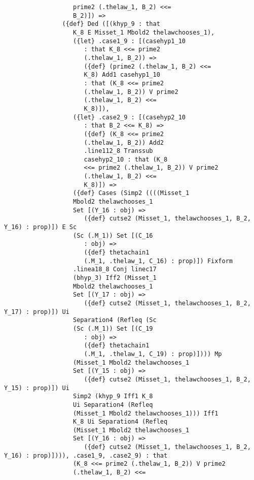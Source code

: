 \documentclass[12pt]{article}
\begin{document}
\begin{verbatim}
                   prime2 (.thelaw_1, B_2) <<= 
                   B_2)]) => 
                ({def} Ded ([(khyp_9 : that 
                   K_8 E Misset_1 Mbold2 thelawchooses_1), 
                   ({let} .case1_9 : [(casehyp1_10 
                      : that K_8 <<= prime2 
                      (.thelaw_1, B_2)) => 
                      ({def} (prime2 (.thelaw_1, B_2) <<= 
                      K_8) Add1 casehyp1_10 
                      : that (K_8 <<= prime2 
                      (.thelaw_1, B_2)) V prime2 
                      (.thelaw_1, B_2) <<= 
                      K_8)]), 
                   ({let} .case2_9 : [(casehyp2_10 
                      : that B_2 <<= K_8) => 
                      ({def} (K_8 <<= prime2 
                      (.thelaw_1, B_2)) Add2 
                      .line112_8 Transsub 
                      casehyp2_10 : that (K_8 
                      <<= prime2 (.thelaw_1, B_2)) V prime2 
                      (.thelaw_1, B_2) <<= 
                      K_8)]) => 
                   ({def} Cases (Simp2 ((((Misset_1 
                   Mbold2 thelawchooses_1 
                   Set [(Y_16 : obj) => 
                      ({def} cutse2 (Misset_1, thelawchooses_1, B_2, Y_16) : prop)]) E Sc 
                   (Sc (.M_1)) Set [(C_16 
                      : obj) => 
                      ({def} thetachain1 
                      (.M_1, .thelaw_1, C_16) : prop)]) Fixform 
                   .linea18_8 Conj linec17 
                   (bhyp_3) Iff2 (Misset_1 
                   Mbold2 thelawchooses_1 
                   Set [(Y_17 : obj) => 
                      ({def} cutse2 (Misset_1, thelawchooses_1, B_2, Y_17) : prop)]) Ui 
                   Separation4 (Refleq (Sc 
                   (Sc (.M_1)) Set [(C_19 
                      : obj) => 
                      ({def} thetachain1 
                      (.M_1, .thelaw_1, C_19) : prop)]))) Mp 
                   (Misset_1 Mbold2 thelawchooses_1 
                   Set [(Y_15 : obj) => 
                      ({def} cutse2 (Misset_1, thelawchooses_1, B_2, Y_15) : prop)]) Ui 
                   Simp2 (khyp_9 Iff1 K_8 
                   Ui Separation4 (Refleq 
                   (Misset_1 Mbold2 thelawchooses_1))) Iff1 
                   K_8 Ui Separation4 (Refleq 
                   (Misset_1 Mbold2 thelawchooses_1 
                   Set [(Y_16 : obj) => 
                      ({def} cutse2 (Misset_1, thelawchooses_1, B_2, Y_16) : prop)]))), .case1_9, .case2_9) : that 
                   (K_8 <<= prime2 (.thelaw_1, B_2)) V prime2 
                   (.thelaw_1, B_2) <<= 

\end{verbatim}
\end{document}
